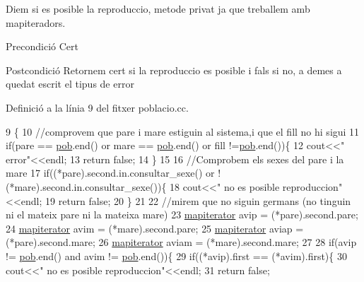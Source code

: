 Diem si es posible la reproduccio, metode privat ja que treballem amb mapiteradors. 

\begin{DoxyPrecond}{Precondició}
Cert 
\end{DoxyPrecond}
\begin{DoxyPostcond}{Postcondició}
Retornem cert si la reproduccio es posible i fals si no, a demes a quedat escrit el tipus de error 
\end{DoxyPostcond}


Definició a la línia 9 del fitxer poblacio.\+cc.


\begin{DoxyCode}
9                                                                                       \{
10     \textcolor{comment}{//comprovem que pare i mare estiguin al sistema,i que el fill no hi sigui}
11     \textcolor{keywordflow}{if}(pare == \hyperlink{classpoblacio_a7ecb70033b151a937143b07d489c4c17}{pob}.end() or mare == \hyperlink{classpoblacio_a7ecb70033b151a937143b07d489c4c17}{pob}.end() or fill !=\hyperlink{classpoblacio_a7ecb70033b151a937143b07d489c4c17}{pob}.end())\{
12       cout<<\textcolor{stringliteral}{"  error"}<<endl;
13       \textcolor{keywordflow}{return} \textcolor{keyword}{false};
14     \}
15 
16     \textcolor{comment}{//Comprobem els sexes del pare i la mare}
17     \textcolor{keywordflow}{if}((*pare).second.in.consultar\_sexe() or !(*mare).second.in.consultar\_sexe())\{
18       cout<<\textcolor{stringliteral}{"  no es posible reproduccion"}<<endl;
19       \textcolor{keywordflow}{return} \textcolor{keyword}{false};
20     \}
21 
22     \textcolor{comment}{//mirem que no siguin germans (no tinguin ni el mateix pare ni la mateixa mare)}
23     \hyperlink{classpoblacio_a52c3d96b08f7679f27487e7499185ed1}{mapiterator} avip = (*pare).second.pare;
24     \hyperlink{classpoblacio_a52c3d96b08f7679f27487e7499185ed1}{mapiterator} avim = (*mare).second.pare;
25     \hyperlink{classpoblacio_a52c3d96b08f7679f27487e7499185ed1}{mapiterator} aviap = (*pare).second.mare;
26     \hyperlink{classpoblacio_a52c3d96b08f7679f27487e7499185ed1}{mapiterator} aviam = (*mare).second.mare;
27 
28     \textcolor{keywordflow}{if}(avip != \hyperlink{classpoblacio_a7ecb70033b151a937143b07d489c4c17}{pob}.end() and avim != \hyperlink{classpoblacio_a7ecb70033b151a937143b07d489c4c17}{pob}.end())\{
29       \textcolor{keywordflow}{if}((*avip).first == (*avim).first)\{
30         cout<<\textcolor{stringliteral}{"  no es posible reproduccion"}<<endl;
31         \textcolor{keywordflow}{return} \textcolor{keyword}{false};

\end{DoxyCode}
